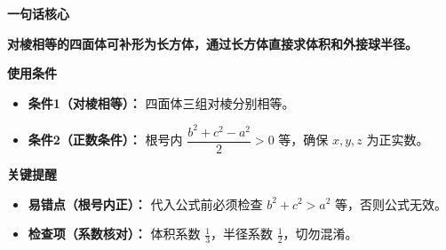 \begin{summarybox}

	\textbf{\textcolor{CSummary}{一句话核心}}

	\textbf{对棱相等的四面体可补形为长方体，通过长方体直接求体积和外接球半径。}

	\medskip
	\textbf{\textcolor{CSummary}{使用条件}}
	\begin{itemize}[leftmargin=*, itemsep=0.5em, topsep=0.4em]
		\item \textbf{条件1（对棱相等）：} 四面体三组对棱分别相等。
		\item \textbf{条件2（正数条件）：} 根号内 $\dfrac{b^2+c^2-a^2}{2}>0$ 等，确保 $x,y,z$ 为正实数。
	\end{itemize}

	\medskip
	\textbf{\textcolor{CSummary}{关键提醒}}
	\begin{itemize}[leftmargin=*, itemsep=0.5em, topsep=0.4em]
		\item \textbf{易错点（根号内正）：} 代入公式前必须检查 $b^2+c^2>a^2$ 等，否则公式无效。
		\item \textbf{检查项（系数核对）：} 体积系数 $\frac13$，半径系数 $\frac12$，切勿混淆。
	\end{itemize}

\end{summarybox}
